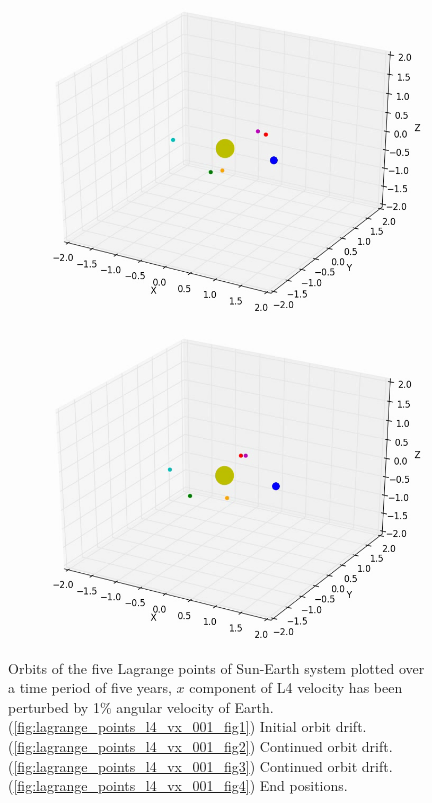 \documentclass[10pt,letterpaper]{article}
\begin{document}
\begin{figure}[!htb]
  \subcaption{}\label{fig:lagrange_points_l4_vx_001_fig2}
\endminipage\hfill
{}%
  \includegraphics[width=\linewidth]{figures/lagrange_points/lagrange_points_l4_vx_001_3.png}
  \subcaption{}\label{fig:lagrange_points_l4_vx_001_fig3}
\endminipage
{}%
  \includegraphics[width=\linewidth]{figures/lagrange_points/lagrange_points_l4_vx_001_4.png}
  \subcaption{}\label{fig:lagrange_points_l4_vx_001_fig4}
\endminipage
\caption{Orbits of the five Lagrange points of Sun-Earth system plotted over a time period of five years, $x$ component of L4 velocity has been perturbed by 1$\%$ angular velocity of Earth.
(\ref{fig:lagrange_points_l4_vx_001_fig1}) Initial orbit drift. 
(\ref{fig:lagrange_points_l4_vx_001_fig2}) Continued orbit drift. 
(\ref{fig:lagrange_points_l4_vx_001_fig3}) Continued orbit drift. 
(\ref{fig:lagrange_points_l4_vx_001_fig4}) End positions.}\label{fig:lagrange_points_l4_vx_001}
\end{figure}
\end{document}
